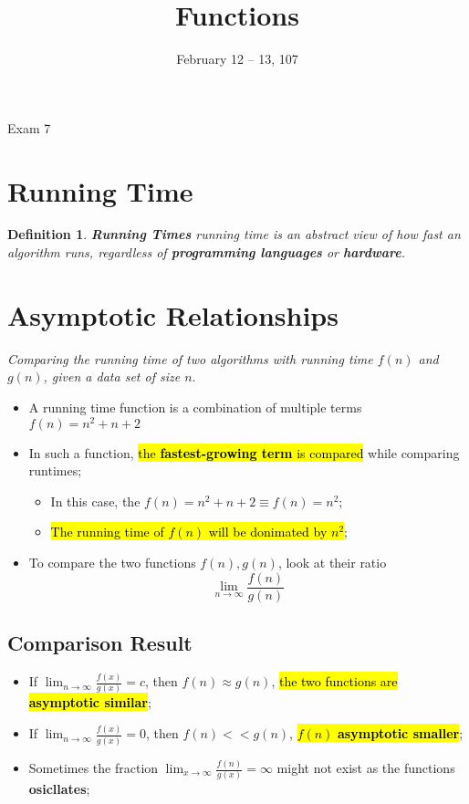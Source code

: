 \documentclass{note}
\date{February 12 -- 13, 107}
\title{Functions}
\newtheorem{definition}{Definition}
\begin{document}
\begin{note}{Exam 7}

\section{Running Time}

\begin{definition}
    \textbf{Running Times} running time is an abstract view of how fast an algorithm runs, regardless of
    \textbf{programming languages} or \textbf{hardware}.
\end{definition}

\section{Asymptotic Relationships}

\textit{Comparing the running time of two algorithms with running time $ f(n) $ and $ g(n) $, given a data set of
size $ n $}.

\begin{itemize}
    \item A running time function is a combination of multiple terms $ f(n) = n^{2} + n + 2 $
    \item In such a function, \hl{the \textbf{fastest-growing term} is compared} while comparing runtimes;
    \begin{itemize}
        \item In this case, the $ f(n) = n^{2} + n + 2 \equiv f(n) = n^{2} $;
        \item \hl{The running time of $ f(n) $ will be donimated by $ n^{2} $};
    \end{itemize}

    \item To compare the two functions $ f(n), g(n) $, look at their ratio
    \begin{displaymath}
        \lim_{n \to \infty} \frac{f(n)}{g(n)}
    \end{displaymath}
\end{itemize}

\subsection{Comparison Result}

\begin{itemize}
    \item If $ \lim_{n \to \infty} \frac{f(x)}{g(x)} = c $, then $f (n) \approx g(n) $, \hl{the two functions are
    \textbf{asymptotic similar}};
    \item If $ \lim_{n \to \infty} \frac{f(x)}{g(x)} = 0 $, then $f (n) << g(n) $, \hl{$ f(n) $
    \textbf{asymptotic smaller}};
    \item Sometimes the fraction $ \lim_{x \to \infty} \frac{f(n)}{g(x)} = \infty $ might not exist as the functions \textbf{osicllates};


\end{itemize}
\end{note}
\end{document}
